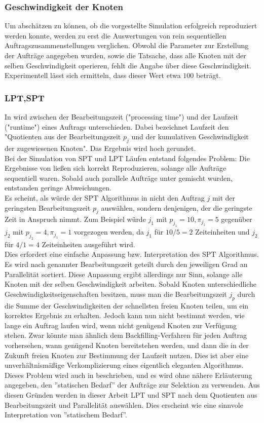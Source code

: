 \subsubsection{Geschwindigkeit der Knoten}
Um abschätzen zu können, ob die vorgestellte Simulation erfolgreich reproduziert werden konnte, werden zu erst die Auswertungen von rein sequentiellen Auftragszusammenstellungen verglichen. Obwohl die Parameter zur Erstellung der Aufträge angegeben wurden, sowie die Tatsache, dass alle Knoten mit der selben Geschwindigkeit operieren, fehlt die Angabe über diese Geschwindigkeit. Experimentell lässt sich ermitteln, dass dieser Wert etwa $100$ beträgt.

\subsubsection{LPT,SPT}
\label{spt-lpt-time}
In \cite{Arn99} wird zwischen der Bearbeitungszeit ("processing time") und der Laufzeit ("runtime") eines Auftrags unterschieden. Dabei bezeichnet Laufzeit den "Quotienten aus der Bearbeitungszeit $p_j$ und der kumulativen Geschwindigkeit der zugewiesenen Knoten". Das Ergebnis wird hoch gerundet.\\
Bei der Simulation von SPT und LPT Läufen entstand folgendes Problem: Die Ergebnisse von \cite{Arn99} ließen sich korrekt Reproduzieren, solange alle Aufträge sequentiell waren. Sobald auch parallele Aufträge unter gemischt wurden, entstanden geringe Abweichungen.\\
Es scheint, als würde der SPT Algorithmus in \cite{Arn99} nicht den Auftrag $j$ mit der geringsten Bearbeitungszeit $p_j$ auswählen, sondern denjenigen, der die geringste Zeit in Anspruch nimmt. Zum Beispiel würde $j_1$ mit $p_{j_1} = 10, \pi_{j_1} = 5$ gegenüber $j_2$ mit $p_{j_2} = 4, \pi_{j_1} = 1$ vorgezogen werden, da $j_1$ für $10/5 = 2$  Zeiteinheiten und $j_2$ für $4/1 = 4$ Zeiteinheiten ausgeführt wird.\\
Dies erfordert eine einfache Anpassung bzw. Interpretation des SPT Algorithmus. Es wird nach genannter Bearbeitungszeit geteilt durch den jeweiligen Grad an Parallelität sortiert. Diese Anpassung ergibt allerdings nur Sinn, solange alle Knoten mit der selben Geschwindigkeit arbeiten. Sobald Knoten unterschiedliche Geschwindigkeitseigenschaften besitzen, muss man die Bearbeitungszeit $j_p$ durch die Summe der Geschwindigkeiten der schnellsten freien Knoten teilen, um ein korrektes Ergebnis zu erhalten. Jedoch kann nun nicht bestimmt werden, wie lange ein Auftrag laufen wird, wenn nicht genügend Knoten zur Verfügung stehen. Zwar könnte man ähnlich dem Backfilling-Verfahren für jeden Auftrag vorhersehen, wann genügend Knoten bereitstehen werden, und dann die in der Zukunft freien Knoten zur Bestimmung der Laufzeit nutzen. Dies ist aber eine unverhältnismäßige Verkomplizierung eines eigentlich eleganten Algorithmus.\\
Dieses Problem wird auch in \cite{Arn99} beschrieben, und es wird ohne nähere Erläuterung angegeben, den ''statischen Bedarf'' der Aufträge zur Selektion zu verwenden. Aus diesen Gründen werden in dieser Arbeit LPT und SPT nach dem Quotienten aus Bearbeitungszeit und Parallelität auswählen. Dies erscheint wie eine sinnvole Interpretation von ''statischem Bedarf''.
